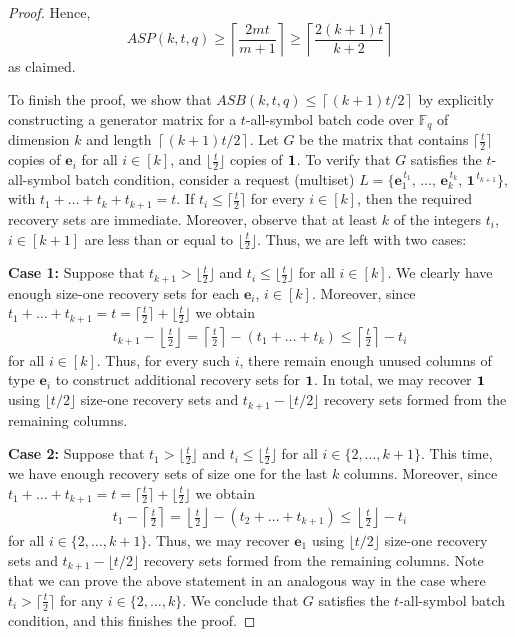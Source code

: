 \documentclass[11pt,a4paper]{article}
\theoremstyle{definition}
\newcommand{\bfe}{{\boldsymbol e}}
\newcommand{\F}{\mathbb{F}}
\begin{document}
\begin{proof}
    Hence, 
    $$
        ASP(k,t,q) \geq \left\lceil \frac{2mt}{m+1}\right\rceil \geq \left\lceil \frac{2(k+1)t}{k+2}\right\rceil
    $$
    as claimed.

    To finish the proof, we show that $ASB(k,t,q) \leq \left\lceil {(k+1)t}/{2} \right\rceil$ by explicitly constructing a generator matrix for a $t$-all-symbol batch code over $\F_q$ of dimension $k$ and length $ \left\lceil {(k+1)t}/{2} \right\rceil$. Let $G$ be the matrix that contains $\lceil\frac{t}{2}\rceil$ copies of $\bfe_i$ for all $i \in [k]$, and $\lfloor\frac{t}{2}\rfloor$ copies of $\bf1$. To verify that $G$ satisfies the $t$-all-symbol batch condition, consider a request (multiset) $L = \{\mathbf \bfe_1^{\,t_1},\, \dots,\, \mathbf \bfe_k^{\,t_k},\, \mathbf 1^{\,t_{k+1}}\},$ with $t_1 + \dots + t_{k} + t_{k+1} = t$. If $t_i\le \lceil\frac{t}{2}\rceil$ for every $i \in [k]$, then the required recovery sets are immediate. Moreover, observe that at least  $k$ of the integers $t_i$, $i \in [k+1]$ are less than or equal to $\lfloor \frac{t}{2}\rfloor$. Thus, we are left with two cases:
    
     \textbf{Case 1:} Suppose that $t_{k+1} > \lfloor \frac{t}{2}\rfloor$ and $t_i \le \lfloor\frac{t} {2}\rfloor$ for all $i \in [k]$. We clearly have enough size-one recovery sets for each $\bfe_i$, $i \in [k]$. Moreover, since $t_1+\dots +t_{k+1}=t=\lceil\frac{t}{2}\rceil+\lfloor\frac{t} {2}\rfloor$ we obtain
    \begin{align*}
        t_{k+1}-\left\lfloor\frac{t}{2}\right\rfloor = \left\lceil\frac{t}{2}\right\rceil-(t_1 + \dots + t_{k}) \le \left\lceil\frac{t}{2}\right\rceil-t_i
    \end{align*}
    for all $i \in [k]$. Thus, for every such \(i\), there remain enough unused columns of type \(\bfe_i\) to construct additional recovery sets for $\bf1$. In total, we may recover $\bf1$ using \(\lfloor t/2 \rfloor\) size-one recovery sets and \(t_{k+1} - \lfloor t/2 \rfloor\) recovery sets formed from the remaining columns.
    
    \textbf{Case 2:} Suppose that $t_1 > \lfloor \frac{t}{2}\rfloor$ and $t_i \le \lfloor\frac{t} {2}\rfloor$ for all $i \in \{2,\dots,k+1\}$. This time, we have enough recovery sets of size one for the last $k$ columns. Moreover, since $t_1+\dots +t_{k+1}=t=\lceil\frac{t}{2}\rceil+\lfloor\frac{t} {2}\rfloor$ we obtain
    \begin{align*}
        t_{1}-\left\lceil\frac{t}{2}\right\rceil = \left\lfloor\frac{t}{2}\right\rfloor-(t_2 + \dots + t_{k+1}) \le \left\lfloor\frac{t}{2}\right\rfloor-t_i
    \end{align*}
    for all $i \in \{2,\dots,k+1\}$. Thus, we may recover $\bfe_1$ using \(\lfloor t/2 \rfloor\) size-one recovery sets and \(t_{k+1} - \lfloor t/2 \rfloor\) recovery sets formed from the remaining columns. Note that we can prove the above statement in an analogous way in the case where $t_i > \lceil\frac{t}{2}\rceil$ for any $i \in \{2,\dots,k\}$. We conclude that $G$ satisfies the $t$-all-symbol batch condition, and this finishes the proof.
\end{proof}
\end{document}

